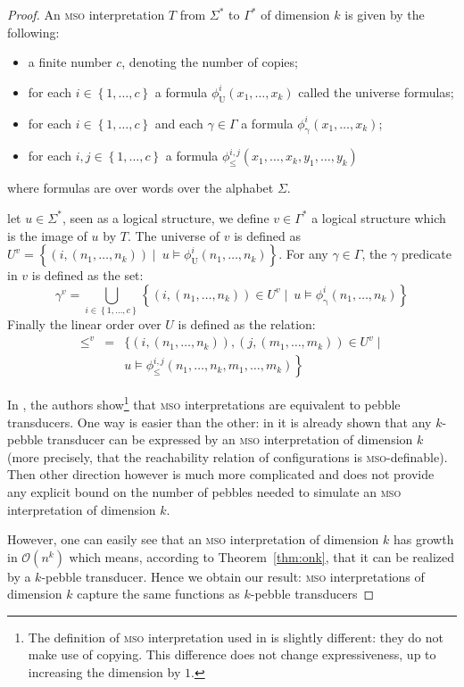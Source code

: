 \documentclass[sigplan,review,anonymous]{acmart}\settopmatter{printfolios=true,printccs=false,printacmref=false}
\newcommand{\set}[1]{\left\{#1 \right\}}
\newcommand{\Oo}{\mathcal O}
\newcommand{\mso}{\textsc{mso}\xspace}
\theoremstyle{definition}
\theoremstyle{remark}
\begin{document}
\msothm*

\begin{proof}
An \mso interpretation $T$ from $\Sigma^*$ to $\Gamma^*$ of dimension $k$ is given by the following:
\begin{itemize}
\item a finite number $c$, denoting the number of copies;
\item for each $i\in \set{1,\ldots,c}$ a formula $\phi_\mathrm{U}^i(x_1,\ldots,x_k)$ called the universe formulas;
\item for each $i\in \set{1,\ldots,c}$ and each $\gamma\in \Gamma$ a formula $\phi_\mathrm{\gamma}^i(x_1,\ldots,x_k)$;
\item for each $i,j\in \set{1,\ldots,c}$ a formula $\phi_\mathrm{\leq}^{i,j}(x_1,\ldots,x_k,y_1,\ldots,y_k)$
\end{itemize}
where formulas are over words over the alphabet $\Sigma$.

let $u\in \Sigma^*$, seen as a logical structure, we define $v\in \Gamma ^*$ a logical structure which is the image of $u$ by $T$.
The universe of $v$ is defined as $U^v=\set{(i,(n_1,\ldots,n_k))\mid\ u\models \phi_\mathrm{U}^i(n_1,\ldots,n_k)}$.
For any $\gamma\in \Gamma$, the $\gamma$ predicate in $v$ is defined as the set:
$$\gamma^v=\bigcup_{i\in \set{1,\ldots,c}}\set{(i,(n_1,\ldots,n_k))\in U^v\mid\ u\models \phi_\mathrm{\gamma}^i(n_1,\ldots,n_k)}$$
Finally the linear order over $U$ is defined as the relation:
$$\begin{array}{ccr}
  
  {\leq}^v&=&\big\{ (i,(n_1,\ldots,n_k)), (j,(m_1,\ldots,m_k))\in U^v\mid \\
  &&\left. u\models \phi_\mathrm{\leq}^{i,j}(n_1,\ldots,n_k,m_1,\ldots,m_k)\right\}

\end{array}$$

In \cite[Theorem 7]{BojanczykKL19}, the authors show\footnote{The definition of \mso interpretation used in \cite{BojanczykKL19} is slightly different: they do not make use of copying. This difference does not change expressiveness, up to increasing the dimension by $1$.} that \mso interpretations are equivalent to pebble transducers.
One way is easier than the other: in \cite[Lemma 2.3]{Bojanczyk18} it is already shown that any $k$-pebble transducer can be expressed by an \mso interpretation of dimension $k$ (more precisely, that the reachability relation of configurations is \mso-definable). Then other direction however is much more complicated and does not provide any explicit bound on the number of pebbles needed to simulate an \mso interpretation of dimension $k$.

However, one can easily see that an \mso interpretation of dimension $k$ has growth in $\Oo(n^k)$ which means, according to Theorem~\ref{thm:onk}, that it can be realized by a $k$-pebble transducer.
Hence we obtain our result: \mso interpretations of dimension $k$ capture the same functions as $k$-pebble transducers

\end{proof}
\end{document}
